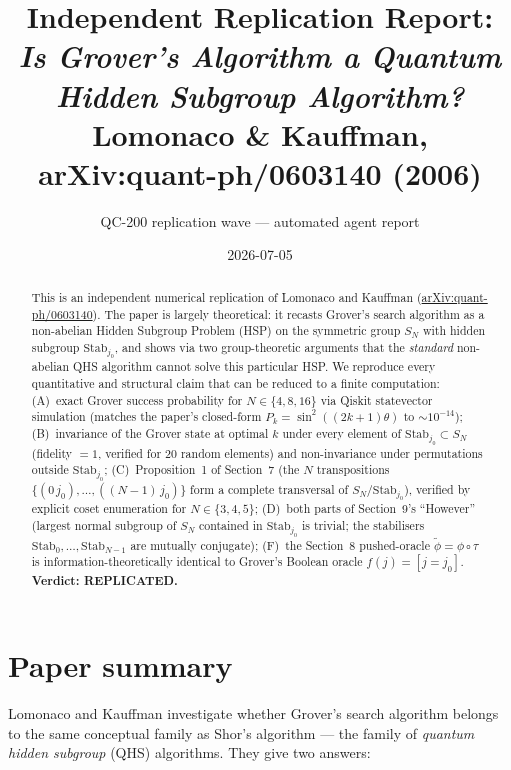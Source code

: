 \documentclass[11pt]{article}
\title{Independent Replication Report:\\
\emph{Is Grover's Algorithm a Quantum Hidden Subgroup Algorithm?}\\
\normalsize Lomonaco \& Kauffman, arXiv:quant-ph/0603140 (2006)}
\author{QC-200 replication wave --- automated agent report}
\date{2026-07-05}
\begin{document}
\maketitle

\begin{abstract}
This is an independent numerical replication of Lomonaco and Kauffman
(\href{https://arxiv.org/abs/quant-ph/0603140}{arXiv:quant-ph/0603140}).
The paper is largely theoretical: it recasts Grover's search algorithm as a
non-abelian Hidden Subgroup Problem (HSP) on the symmetric group $S_N$ with
hidden subgroup $\mathrm{Stab}_{j_0}$, and shows via two group-theoretic
arguments that the \emph{standard} non-abelian QHS algorithm cannot solve
this particular HSP.  We reproduce every quantitative and structural claim
that can be reduced to a finite computation: (A)~exact Grover success
probability for $N\in\{4,8,16\}$ via Qiskit statevector simulation
(matches the paper's closed-form
$P_k=\sin^{2}((2k{+}1)\theta)$ to $\sim\!10^{-14}$);
(B)~invariance of the Grover state at optimal $k$ under every element of
$\mathrm{Stab}_{j_0}\subset S_N$ (fidelity $=1$, verified for 20 random
elements) and non-invariance under permutations outside
$\mathrm{Stab}_{j_0}$; (C)~Proposition~1 of Section~7 (the $N$
transpositions $\{(0\,j_0),\dots,((N{-}1)\,j_0)\}$ form a complete
transversal of $S_N/\mathrm{Stab}_{j_0}$), verified by explicit coset
enumeration for $N\in\{3,4,5\}$; (D)~both parts of Section~9's ``However''
(largest normal subgroup of $S_N$ contained in $\mathrm{Stab}_{j_0}$ is
trivial; the stabilisers $\mathrm{Stab}_{0},\dots,\mathrm{Stab}_{N-1}$ are
mutually conjugate); (F)~the Section~8 pushed-oracle
$\widetilde{\phi}=\phi\circ\tau$ is information-theoretically identical to
Grover's Boolean oracle $f(j)=[j=j_0]$.
\textbf{Verdict: REPLICATED.}
\end{abstract}

\section{Paper summary}

Lomonaco and Kauffman investigate whether Grover's search algorithm belongs
to the same conceptual family as Shor's algorithm --- the family of
\emph{quantum hidden subgroup} (QHS) algorithms.  They give two answers:
\end{document}
